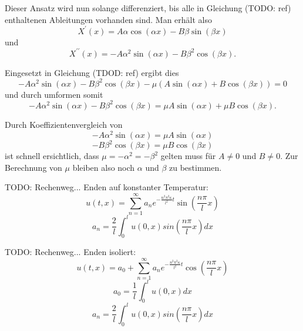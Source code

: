 Dieser Ansatz wird nun solange differenziert, bis alle in Gleichung (TODO: ref)
enthaltenen Ableitungen vorhanden sind. Man erhält also
\[
    X^{\prime}(x)
    =
    A \alpha \cos \left( \alpha x \right) -
    B \beta \sin \left( \beta x \right)
\]
und
\[
    X^{\prime \prime}(x)
    =
    -A \alpha^{2} \sin \left( \alpha x \right) -
    B \beta^{2} \cos \left( \beta x \right).
\]

Eingesetzt in Gleichung (TDOD: ref) ergibt dies
\[
    -A\alpha^{2}\sin(\alpha x) - B\beta^{2}\cos(\beta x) -
    \mu\left(A\sin(\alpha x) + B\cos(\beta x)\right)
    =
    0
\]
und durch umformen somit
\[
    -A\alpha^{2}\sin(\alpha x) - B\beta^{2}\cos(\beta x)
    =
    \mu A\sin(\alpha x) + \mu B\cos(\beta x).
\]

Durch Koeffizientenvergleich von
\[
    -A\alpha^{2}\sin(\alpha x)
    =
    \mu A\sin(\alpha x)
\]
\[
    -B\beta^{2}\cos(\beta x)
    =
    \mu B\cos(\beta x)
\]
ist schnell ersichtlich, dass $ \mu = -\alpha^{2} = -\beta^{2} $ gelten muss für
$ A \neq 0 $ und $ B \neq 0 $. Zur Berechnung von $ \mu $ bleiben also noch 
$ \alpha $ und $ \beta $ zu bestimmen.

TODO: Rechenweg... Enden auf konstanter Temperatur:
\[
    u(t,x)
    =
    \sum_{n=1}^{\infty}a_{n}e^{-\frac{n^{2}\pi^{2}\kappa}{l^{2}}t}
    \sin\left(\frac{n\pi}{l}x\right)
\]
\[
    a_{n}
    =
    \frac{2}{l}\int_{0}^{l}u(0,x)sin\left(\frac{n\pi}{l}x\right) dx
\]

TODO: Rechenweg... Enden isoliert:
\[
    u(t,x)
    =
    a_{0} + \sum_{n=1}^{\infty}a_{n}e^{-\frac{n^{2}\pi^{2}\kappa}{l^{2}}t}
    \cos\left(\frac{n\pi}{l}x\right)
\]
\[
    a_{0}
    =
    \frac{1}{l}\int_{0}^{l}u(0,x) dx
\]
\[
    a_{n}
    =
    \frac{2}{l}\int_{0}^{l}u(0,x)sin\left(\frac{n\pi}{l}x\right) dx
\]
